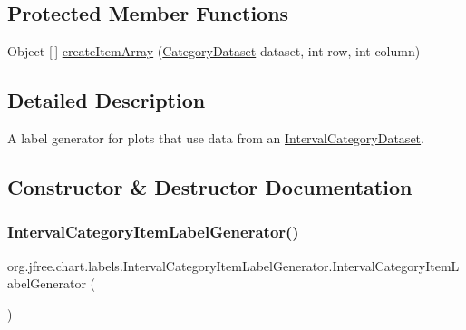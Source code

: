 \subsection*{Protected Member Functions}
\begin{DoxyCompactItemize}
\item 
Object \mbox{[}$\,$\mbox{]} \mbox{\hyperlink{classorg_1_1jfree_1_1chart_1_1labels_1_1_interval_category_item_label_generator_a192386ce9e7949492c2b885a2742f801}{create\+Item\+Array}} (\mbox{\hyperlink{interfaceorg_1_1jfree_1_1data_1_1category_1_1_category_dataset}{Category\+Dataset}} dataset, int row, int column)
\end{DoxyCompactItemize}


\subsection{Detailed Description}
A label generator for plots that use data from an \mbox{\hyperlink{}{Interval\+Category\+Dataset}}. 

\subsection{Constructor \& Destructor Documentation}
\mbox{\label{classorg_1_1jfree_1_1chart_1_1labels_1_1_interval_category_item_label_generator_aeff18ce645e584294235e322d8217a12}} 
\subsubsection{\texorpdfstring{Interval\+Category\+Item\+Label\+Generator()}{IntervalCategoryItemLabelGenerator()}\hspace{0.1cm}{\footnotesize\ttfamily [1/3]}}
{\footnotesize\ttfamily org.\+jfree.\+chart.\+labels.\+Interval\+Category\+Item\+Label\+Generator.\+Interval\+Category\+Item\+Label\+Generator (\begin{DoxyParamCaption}{ }\end{DoxyParamCaption})}

